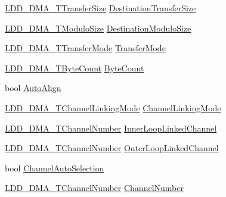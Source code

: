 \begin{DoxyCompactItemize}
\hyperlink{group___p_e___types__module_ga868f08f9448e5df27a38314f0893d84a}{L\-D\-D\-\_\-\-D\-M\-A\-\_\-\-T\-Transfer\-Size} \hyperlink{struct_l_d_d___d_m_a___t_transfer_descriptor_aab2978b1b8d4a4774a5e2c298d58479f}{Destination\-Transfer\-Size}
\item 
\hyperlink{group___p_e___types__module_gacf2f2d4310e7634351c68e1f64a4c483}{L\-D\-D\-\_\-\-D\-M\-A\-\_\-\-T\-Modulo\-Size} \hyperlink{struct_l_d_d___d_m_a___t_transfer_descriptor_a2d9a37eb9dc192ae554e0dca033a1e3e}{Destination\-Modulo\-Size}
\item 
\hyperlink{group___p_e___types__module_gacd7d4c29cfce815e9e44755c0153f31b}{L\-D\-D\-\_\-\-D\-M\-A\-\_\-\-T\-Transfer\-Mode} \hyperlink{struct_l_d_d___d_m_a___t_transfer_descriptor_a0a932c1e965e131c25e45159f71831fe}{Transfer\-Mode}
\item 
\hyperlink{group___p_e___types__module_gac001a681eb67942fa78ac9b62ba3b0d6}{L\-D\-D\-\_\-\-D\-M\-A\-\_\-\-T\-Byte\-Count} \hyperlink{struct_l_d_d___d_m_a___t_transfer_descriptor_aa02f90cb635b64ab6217e714bcdb1462}{Byte\-Count}
\item 
bool \hyperlink{struct_l_d_d___d_m_a___t_transfer_descriptor_a7cf775aea2661c99d4fc11d6d18f862c}{Auto\-Align}
\item 
\hyperlink{group___p_e___types__module_ga7a25c76afefd56aca723c89d7098c89b}{L\-D\-D\-\_\-\-D\-M\-A\-\_\-\-T\-Channel\-Linking\-Mode} \hyperlink{struct_l_d_d___d_m_a___t_transfer_descriptor_aad65e9cb849dda683d80af1dae92b5fb}{Channel\-Linking\-Mode}
\item 
\hyperlink{group___p_e___types__module_gad268d607015891269cb015faa8bc0dac}{L\-D\-D\-\_\-\-D\-M\-A\-\_\-\-T\-Channel\-Number} \hyperlink{struct_l_d_d___d_m_a___t_transfer_descriptor_a78eb4ce6c6e05add15799c5389637ce3}{Inner\-Loop\-Linked\-Channel}
\item 
\hyperlink{group___p_e___types__module_gad268d607015891269cb015faa8bc0dac}{L\-D\-D\-\_\-\-D\-M\-A\-\_\-\-T\-Channel\-Number} \hyperlink{struct_l_d_d___d_m_a___t_transfer_descriptor_a14137cdb670d104436bfdad1bb88f078}{Outer\-Loop\-Linked\-Channel}
\item 
bool \hyperlink{struct_l_d_d___d_m_a___t_transfer_descriptor_aae81aa421cebab862ae4b8ca9d384318}{Channel\-Auto\-Selection}
\item 
\hyperlink{group___p_e___types__module_gad268d607015891269cb015faa8bc0dac}{L\-D\-D\-\_\-\-D\-M\-A\-\_\-\-T\-Channel\-Number} \hyperlink{struct_l_d_d___d_m_a___t_transfer_descriptor_a22d5f3770a3c62c4bb7e426b4d5d96c8}{Channel\-Number}
\item 

\end{DoxyCompactItemize}
